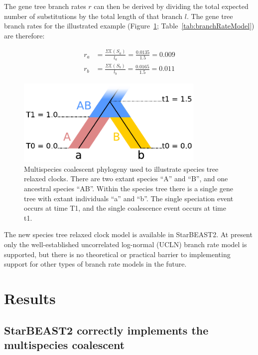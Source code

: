 \documentclass[12pt]{article}
\begin{document}
The gene tree branch rates $r$ can then be derived by dividing the total
expected number of substitutions by the total length of that branch $l$. The
gene tree branch rates for the illustrated example
(Figure~\ref{fig:branchRateModel}; Table~\ref{tab:branchRateModel}) are
therefore:

\begin{align}
r_a &= \frac{\Sigma \mathbb{E}(S_a)}{l_a} = \frac{0.0135}{1.5} = 0.009\\
r_b &= \frac{\Sigma \mathbb{E}(S_b)}{l_b} = \frac{0.0165}{1.5} = 0.011
\end{align}

\begin{figure}[htb!]
\centering
\includegraphics[width=9cm]{relaxed_clock.pdf}
\caption
{Multispecies coalescent phylogeny used to illustrate species tree relaxed
clocks. There are two extant species ``A'' and ``B'', and one ancestral species ``AB''.
Within the species tree there is a single gene tree with extant individuals ``a''
and ``b''. The single speciation event occurs at time T1, and the single coalescence
event occurs at time t1.}
\label{fig:branchRateModel}
\end{figure}

The new species tree relaxed clock model is available in StarBEAST2. At present
only the well-established uncorrelated log-normal (UCLN) branch rate model
\citep{10.1371/journal.pbio.0040088} is supported, but there is no theoretical
or practical barrier to implementing support for other types of branch rate
models in the future.

\section*{Results}

\subsection*{StarBEAST2 correctly implements the multispecies coalescent}
\end{document}
